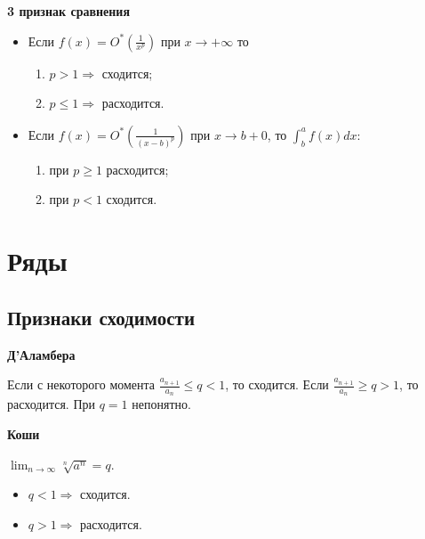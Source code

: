 \documentclass[a4paper]{article}
\begin{document}
\begin{hproof}
\textbf{3 признак сравнения}

\begin{itemize}
\item Если $f(x) = O^*\left( \frac{1}{x^p} \right)$ при $x \rightarrow +\infty$ то

\begin{enumerate}
\item $p>1 \Rightarrow $ сходится; 
\item $p \leq 1 \Rightarrow $ расходится.
\end{enumerate}

\item Если $f(x) = O^*\left( \frac{1}{(x-b)^p} \right)$ при $x \rightarrow b+0$, то $\int_b^a f(x)dx$:

\begin{enumerate}
\item при $p \geq 1$ расходится;
\item при $p < 1$ сходится.
\end{enumerate}

\end{itemize}
\end{hproof}

\section*{Ряды}

\subsection*{Признаки сходимости}

\begin{hproof}\textbf{Д'Аламбера}

Если с некоторого момента $\frac{a_{n+1}}{a_n} \leq q < 1$, то сходится.
Если $\frac{a_{n+1}}{a_n} \geq q > 1$, то расходится.
При $q = 1$ непонятно.

\end{hproof}

\begin{hproof}\textbf{Коши}

$\lim_{n \rightarrow \infty} \sqrt[n]{a^n} = q$.

\begin{itemize}
\item $q<1 \Rightarrow$ сходится.
\item $q>1 \Rightarrow$ расходится.
\end{itemize}
\end{hproof}
\end{document}
